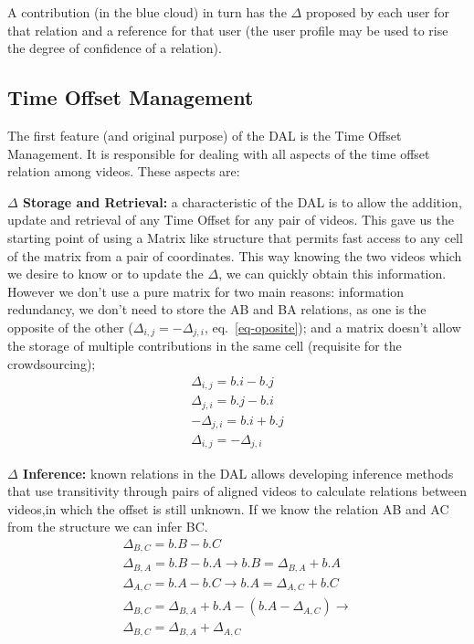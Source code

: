 \documentclass[sigconf]{acmart}
\begin{document}
A contribution (in the blue cloud) in turn has the $\Delta$ proposed by each user for that relation and a reference for that user (the user profile may be used to rise the degree of confidence of a relation).

\subsection{Time Offset Management}
The first feature (and original purpose) of the DAL is the Time Offset Management. It is responsible for dealing with all aspects of the time offset relation among videos. These aspects are:

	\textbf{$\Delta$ Storage and Retrieval:} a characteristic of the DAL is to allow the addition, update and retrieval of any Time Offset for any pair of videos. This gave us the starting point of using a Matrix like structure that permits fast access to any cell of the matrix  from a pair of coordinates. This way knowing the two videos which we desire to know or to update the $\Delta$, we can quickly obtain this information. However we don't use a pure matrix for two main reasons: information redundancy, we don't need to store the AB and BA relations, as one is the opposite of the other ($\Delta_{i,j} = -\Delta_{j,i}$, eq.~\ref{eq-oposite}); and a matrix doesn't allow the storage of multiple contributions in the same cell (requisite for the crowdsourcing);
\begin{eqnarray}
	\label{eq-oposite}
	\Delta_{i,j} = b.i - b.j	\nonumber \\
	\Delta_{j,i} = b.j - b.i	\nonumber \\
	-\Delta_{j,i} = b.i + b.j	\nonumber \\
	\Delta_{i,j} = -\Delta_{j,i}
\end{eqnarray}

	\textbf{$\Delta$ Inference:} known relations in the DAL allows developing inference methods that use transitivity through pairs of aligned videos to calculate relations between videos,in which the offset is still unknown. If we know the relation AB and AC from the structure we can infer BC.	
\begin{eqnarray}
	\label{dina-i}
	\Delta_{B,C} = b.B - b.C	\nonumber \\
	\Delta_{B,A} = b.B - b.A \rightarrow b.B = \Delta_{B,A} + b.A	\nonumber \\
	\Delta_{A,C} = b.A - b.C \rightarrow b.A = \Delta_{A,C} + b.C	\nonumber \\
	\Delta_{B,C}= \Delta_{B,A} + b.A - (b.A-\Delta_{A,C}) \rightarrow \nonumber \\ \Delta_{B,C} = \Delta_{B,A} + \Delta_{A,C}	
\end{eqnarray}
\end{document}
